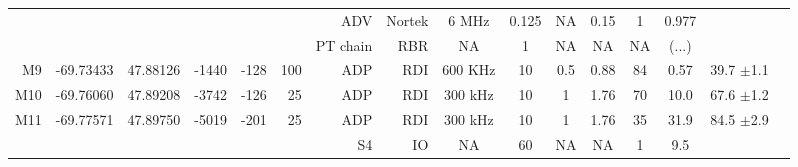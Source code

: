 \begin{sidewaystable}
\begin{tabular}{|r|c|c|r|r|r|r|r|c|c|c|c|c|c|c|c|}
    ~                   &                            &                           &                        &                      &                     & ADV          & Nortek     & 6 MHz     & 0.125     & NA       & 0.15       & 1          & 0.977      &                                    \\ %
    ~                   &                            &                           &                        &                      &                     & PT chain     & RBR        & NA        & 1         & NA       & NA         & NA         & (...)      &                                    \\\hline
    M9                  & -69.73433                  & 47.88126                  & -1440                  & -128                 & 100                 & ADP          & RDI        & 600 KHz   & 10        & 0.5      & 0.88       & 84         & 0.57       &  39.7 $\pm$1.1                     \\\hline
    M10                 & -69.76060                  & 47.89208                  & -3742                  & -126                 & 25                  & ADP          & RDI        & 300 kHz   & 10        & 1        & 1.76       & 70         & 10.0       &  67.6 $\pm$1.2                     \\\hline
    \multirow{2}{*}{M11}& \multirow{2}{*}{-69.77571} & \multirow{2}{*}{47.89750} & \multirow{2}{*}{-5019} & \multirow{2}{*}{-201}& \multirow{2}{*}{25} & ADP          & RDI        & 300 kHz   & 10        & 1        & 1.76       & 35         & 31.9       &  \multirow{2}{*}{84.5 $\pm$2.9}    \\
    ~                   &                            &                           &                        &                      &                     & S4           & IO         & NA        & 60        & NA       & NA         & 1          & 9.5        &                                    \\\hline
 \end{tabular}


\end{sidewaystable}
